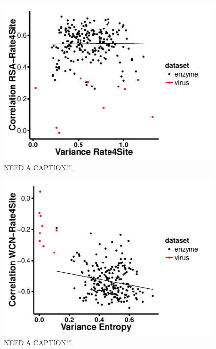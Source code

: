 \documentclass[12pt]{article}
\begin{document}
            \begin{figure}[H]
            \centerline{\includegraphics[width=5.0in]{var_rate_rsa_cor.pdf}}     
            \caption{NEED A CAPTION!!!.}
            \label{fig:seqent_structure_cors}
    \end{figure}
    
        \begin{figure}[H]
            \centerline{\includegraphics[width=5.0in]{var_entropy_rate_cor.pdf}}     
            \caption{NEED A CAPTION!!!.}
            \label{fig:seqent_structure_cors}
    \end{figure}
 
\end{document}

